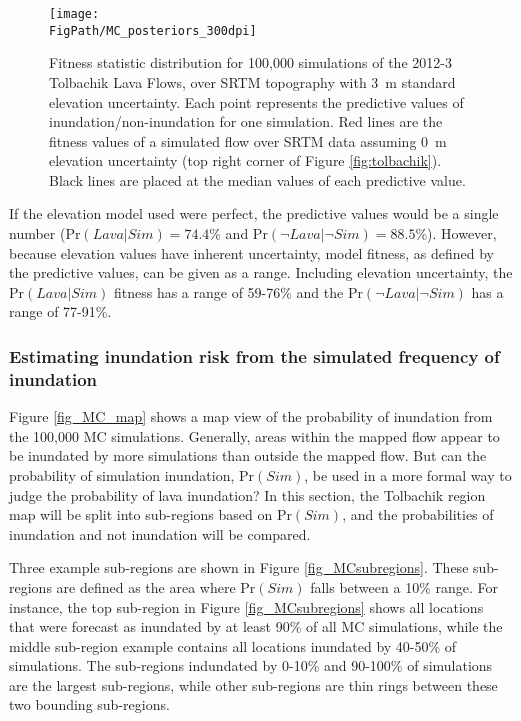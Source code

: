 		\begin{figure}[h!]
			\centering
			\texttt{[image: \\FigPath/MC\_posteriors\_300dpi]}
			\caption[Fitness statistic distribution of Monte Carlo simulations of the 2012-3 Tolbachik lava flows, over SRTM topography with 3~m standard elevation uncertainty]{Fitness statistic distribution for 100,000 simulations of the 2012-3 Tolbachik Lava Flows, over SRTM topography with 3~m standard elevation uncertainty. Each point represents the predictive values of inundation/non-inundation for one simulation. Red lines are the fitness values of a simulated flow over SRTM data assuming 0~m elevation uncertainty (top right corner of Figure \ref{fig:tolbachik}). Black lines are placed at the median values of each predictive value.}
			\label{fig:MC_dist}
		\end{figure}
			
			If the elevation model used were perfect, the predictive values would be a single number ($\text{Pr}(Lava|Sim)=74.4$\% and $\text{Pr}(\neg Lava|\neg Sim)=88.5$\%). However, because elevation values have inherent uncertainty, model fitness, as defined by the predictive values, can be given as a range. Including elevation uncertainty, the $\text{Pr}(Lava|Sim)$ fitness has a range of 59-76\% and the $\text{Pr}(\neg Lava|\neg Sim)$ has a range of 77-91\%.


		\subsubsection{Estimating inundation risk from the simulated frequency of inundation}
		Figure \ref{fig_MC_map} shows a map view of the probability of inundation from the 100,000 MC simulations. Generally, areas within the mapped flow appear to be inundated by more simulations than outside the mapped flow. But can the probability of simulation inundation, $\text{Pr}(Sim)$, be used in a more formal way to judge the probability of lava inundation? In this section, the Tolbachik region map will be split into sub-regions based on $\text{Pr}(Sim)$, and the probabilities of inundation and not inundation will be compared.
		
		Three example sub-regions are shown in Figure \ref{fig_MCsubregions}. These sub-regions are defined as the area where $\text{Pr}(Sim)$ falls between a 10\% range. For instance, the top sub-region in Figure \ref{fig_MCsubregions} shows all locations that were forecast as inundated by at least 90\% of all MC simulations, while the middle sub-region example contains all locations inundated by 40-50\% of simulations. The sub-regions indundated by 0-10\% and 90-100\% of simulations are the largest sub-regions, while other sub-regions are thin rings between these two bounding sub-regions.
		
